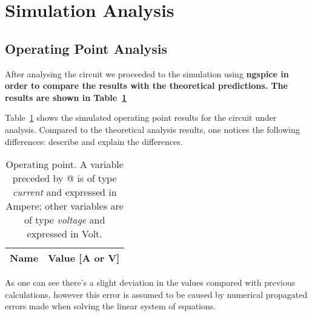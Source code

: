 \section{Simulation Analysis}
\label{sec:simulation}

\subsection{Operating Point Analysis}

\par After analysing the circuit we proceeded to the simulation using \bf{ngspice} in order to
compare the results with the theoretical predictions. The results are shown in Table~\ref{tab:op}

Table~\ref{tab:op} shows the simulated operating point results for the circuit
under analysis. Compared to the theoretical analysis results, one notices the
following differences: describe and explain the differences.

\begin{table}[h]
	\centering
	\begin{tabular}{|l|r|}
		\hline    
		{\bf Name} & {\bf Value [A or V]} \\ \hline
		
	\end{tabular}
	\caption{Operating point. A variable preceded by @ is of type {\em current}
		and expressed in Ampere; other variables are of type {\it voltage} and expressed in
		Volt.}
	\label{tab:op}
\end{table}

\par As one can see there's a slight deviation in the values compared with previous calculations,
however this error is assumed to be caused by numerical propagated errors made when solving the linear 
system of equations. %







